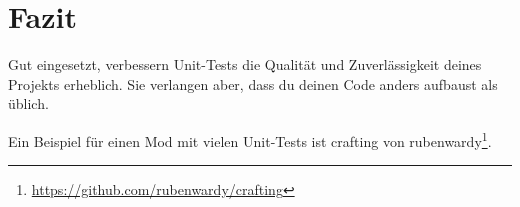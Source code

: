 \begin{Shaded}
\begin{Highlighting}[]
\OperatorTok{(}\OperatorTok{,} \OperatorTok{()}
         \OperatorTok{=} \OperatorTok{\{\}} 

        \OperatorTok{(}
            \OperatorTok{,}
        \OperatorTok{)}

          \OperatorTok{=} \OperatorTok{\{}
            \OperatorTok{\{}
                 \OperatorTok{=} \OperatorTok{,}
                 \OperatorTok{=} \OperatorTok{,}
            \OperatorTok{\},}
            \OperatorTok{\{}
                 \OperatorTok{=} \OperatorTok{,}
                 \OperatorTok{=} \OperatorTok{,}
            \OperatorTok{\},}
        \OperatorTok{\}}
        \OperatorTok{(}\OperatorTok{,} \OperatorTok{)}
    \OperatorTok{)}
\OperatorTok{)}
\end{Highlighting}
\end{Shaded}

\section{Fazit}\label{fazit}

Gut eingesetzt, verbessern Unit-Tests die Qualität und Zuverlässigkeit
deines Projekts erheblich. Sie verlangen aber, dass du deinen Code
anders aufbaust als üblich.

Ein Beispiel für einen Mod mit vielen Unit-Tests ist crafting von
rubenwardy\footnote{\url{https://github.com/rubenwardy/crafting}}.

